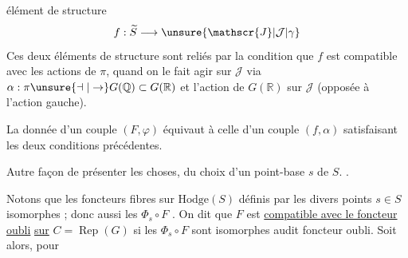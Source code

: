  élément de structure
\[
f:\widetilde{S}\longrightarrow\unsure{\mathscr{J}|\mathcal{J}|\gamma}
\]
Ces deux éléments de structure sont reliés par la condition que $f$ est compatible avec les actions de $\pi$, quand on le fait agir sur $\mathscr{J}$ via $\alpha:\pi\unsure{\dashv|\to}G(\mathbb{Q})\subset G(\mathbb{R})$ et l'action  de $G(\mathbb{R})$ sur $\mathscr{J}$ (opposée à l'action gauche).

La donnée d'un couple $(F,\varphi)$ équivaut à celle d'un couple $(f,\alpha)$ satisfaisant les deux conditions précédentes.


Autre façon de présenter les choses,  du choix d'un point-base $s$ de $S$. .

 Notons que les foncteurs fibres  sur  $\mathrm{Hodge}(S)$ définis par les divers points $s\in S$   isomorphes ; donc aussi les $\Phi_s\circ F$ . On dit que  $F$ est \uline{compatible avec le foncteur} \uline{oubli} \uline{sur} $C=\operatorname{Rep}(G)$ si les $\Phi_s\circ F$ sont isomorphes audit foncteur oubli. Soit alors, pour

